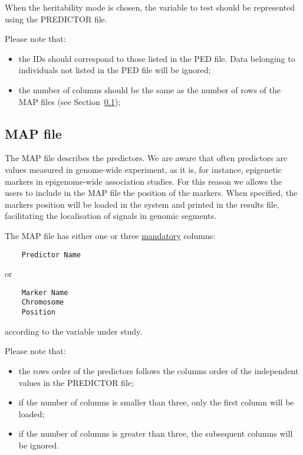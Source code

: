 \documentclass[a4paper,9pt]{article}
\newcommand{\minusitem}{\item[-]}
\begin{document}
\noindent 
When the heritability mode is chosen, the variable to test should be represented using the PREDICTOR file.

\vspace{0.3cm}

\noindent
Please note that:
\begin{itemize}
	\setlength{\itemsep}{-3pt}
	\minusitem the IDs should correspond to those listed in the PED file. Data belonging to individuals not listed in the PED file will be ignored;
	\minusitem the number of columns should be the same as the number of rows of the MAP files (see Section~\ref{sec:mapfile});
\end{itemize}




\subsection{MAP file}
\label{sec:mapfile}

The MAP file describes the predictors. We are aware that often predictors are values measured in genome-wide experiment, as it is, for instance, epigenetic markers in epigenome-wide association studies. For this reason we allows the users to include in the MAP file the position of the markers. When specified, the markers position will be loaded in the system and printed in the results file, facilitating the localisation of signals in genomic segments.


\noindent
The MAP file has either one or three \underline{mandatory} columns:

\begin{Verbatim}
	Predictor Name
\end{Verbatim}
%
or
%
\begin{Verbatim}
	Marker Name
	Chromosome
	Position
\end{Verbatim}
%
according to the variable under study.

\vspace{0.3cm}

\noindent
Please note that:
\begin{itemize}
	\setlength{\itemsep}{-3pt}
	\minusitem the rows order of the predictors follows the columns order of the independent values in the PREDICTOR file;
	\minusitem if the number of columns is smaller than three, only the first column will be loaded;
	\minusitem if the number of columns is greater than three, the subsequent columns will be ignored.
\end{itemize}
\end{document}
